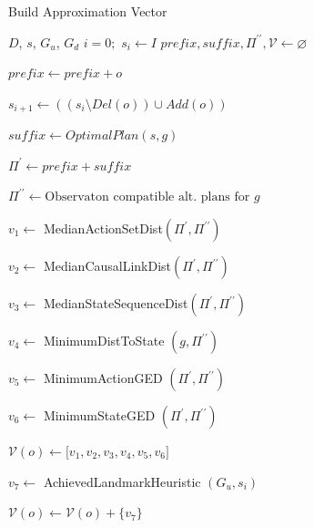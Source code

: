 \begin{algorithm}[tb]
\scriptsize
	\caption{Build Approximation Vector}
	\label{alg:apx}
	\begin{algorithmic}[1]
		\Require $D$, $s$, $G_u$, $G_d$
		\State $i=0;$ $ s_{i} \gets I $
		\State $prefix,suffix,\Pi^{\prime\prime}, \mathcal{V} \gets \varnothing$
			\State \parbox[t]{0.95\linewidth}{$prefix \gets prefix + o$}
			\State \parbox[t]{0.95\linewidth} 
				{$s_{i+1} \gets ((s_{i} \setminus Del(o))\cup Add(o))$}
				\State \parbox[t]{0.95\linewidth}{$suffix \gets OptimalPlan(s,g)$}
				\State \parbox[t]{0.95\linewidth}{$\Pi^\prime \gets prefix + suffix$}
				\State \parbox[t]{0.95\linewidth}{$\Pi^{\prime\prime} \gets \text{Observaton compatible alt. plans for } g$}
				\State \parbox[t]{0.95\linewidth}{$v_1 \gets$ MedianActionSetDist$(\Pi^\prime, \Pi^{\prime\prime})$}
				\State \parbox[t]{0.95\linewidth}{$v_2 \gets$ MedianCausalLinkDist$(\Pi^\prime, \Pi^{\prime\prime})$}
				\State \parbox[t]{0.95\linewidth}{$v_3 \gets$ MedianStateSequenceDist$(\Pi^\prime,\Pi^{\prime\prime})$}
				\State \parbox[t]{0.95\linewidth}{$v_4 \gets$ MinimumDistToState $(g,\Pi^{\prime\prime})$}
				\State \parbox[t]{0.95\linewidth}{$v_5 \gets$ MinimumActionGED $(\Pi^\prime, \Pi^{\prime\prime})$}
				\State \parbox[t]{0.95\linewidth}{$v_6 \gets$ MinimumStateGED $(\Pi^\prime, \Pi^{\prime\prime})$}
				\State $\mathcal{V}(o) \gets \lbrack v_1,v_2,v_3,v_4,v_5,v_6\rbrack $
			\EndFor
			\State \parbox[t]{0.95\linewidth}{$v_7 \gets$ AchievedLandmarkHeuristic $(G_u,s_{i})$}
			\State $\mathcal{V}(o) \gets \mathcal{V}(o)+\{v_7\}$
		\EndFor
		\EndProcedure
	\end{algorithmic}
\end{algorithm}